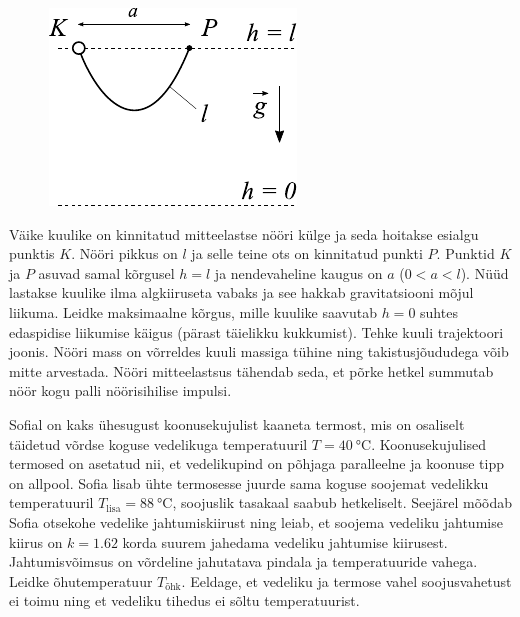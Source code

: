 \documentclass[10pt]{article}
\begin{document}
\begin{figure}
\vspace{-20pt}
  \begin{center}
    \includegraphics[width=1\linewidth]{2024-v2g-06-yl.pdf}
  \end{center}
  \vspace{-15pt}
\end{figure}

Väike kuulike on kinnitatud mitteelastse nööri külge ja seda hoitakse esialgu punktis $K$. Nööri pikkus on $l$ ja selle teine ots on kinnitatud punkti $P$. Punktid $K$ ja $P$ asuvad samal kõrgusel $h=l$ ja nendevaheline kaugus on $a$ ($0<a<l$). Nüüd lastakse kuulike ilma algkiiruseta vabaks ja see hakkab gravitatsiooni mõjul liikuma. Leidke maksimaalne kõrgus, mille kuulike saavutab $h=0$ suhtes edaspidise liikumise käigus (pärast täielikku kukkumist). Tehke kuuli trajektoori joonis. Nööri mass on võrreldes kuuli massiga tühine ning takistusjõududega võib mitte arvestada. Nööri mitteelastsus tähendab seda, et põrke hetkel summutab nöör kogu palli nöörisihilise impulsi.
\probend
\bigskip


Sofial on kaks ühesugust koonusekujulist kaaneta termost, mis on osaliselt täidetud võrdse koguse vedelikuga temperatuuril $T=\SI{40}{\celsius}$. Koonusekujulised termosed on asetatud nii, et vedelikupind on põhjaga paralleelne ja koonuse tipp on allpool. Sofia lisab ühte termosesse juurde sama koguse soojemat vedelikku temperatuuril $T_\text{lisa} = \SI{88}{\celsius}$, soojuslik tasakaal saabub hetkeliselt. Seejärel mõõdab Sofia otsekohe vedelike jahtumiskiirust ning leiab, et soojema vedeliku jahtumise kiirus on $k=\num{1.62}$ korda suurem jahedama vedeliku jahtumise kiirusest. Jahtumisvõimsus on võrdeline jahutatava pindala ja temperatuuride vahega. Leidke õhutemperatuur $T_\text{õhk}$. Eeldage, et vedeliku ja termose vahel soojusvahetust ei toimu ning et vedeliku tihedus ei sõltu temperatuurist.
\end{document}
